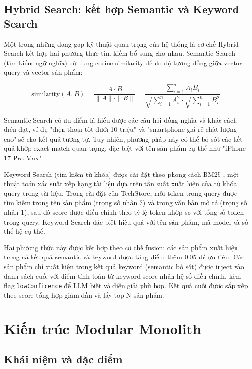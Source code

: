 \subsection{Hybrid Search: kết hợp Semantic và Keyword Search}

Một trong những đóng góp kỹ thuật quan trọng của hệ thống là cơ chế Hybrid Search kết hợp hai phương thức tìm kiếm bổ sung cho nhau. Semantic Search (tìm kiếm ngữ nghĩa) sử dụng cosine similarity để đo độ tương đồng giữa vector query và vector sản phẩm:

\begin{equation}
\text{similarity}(A, B) = \frac{A \cdot B}{\|A\| \cdot \|B\|} = \frac{\sum_{i=1}^{n} A_i B_i}{\sqrt{\sum_{i=1}^{n} A_i^2} \cdot \sqrt{\sum_{i=1}^{n} B_i^2}}
\end{equation}

Semantic Search có ưu điểm là hiểu được các câu hỏi đồng nghĩa và khác cách diễn đạt, ví dụ "điện thoại tốt dưới 10 triệu" và "smartphone giá rẻ chất lượng cao" sẽ cho kết quả tương tự. Tuy nhiên, phương pháp này có thể bỏ sót các kết quả khớp exact match quan trọng, đặc biệt với tên sản phẩm cụ thể như "iPhone 17 Pro Max".

Keyword Search (tìm kiếm từ khóa) được cài đặt theo phong cách BM25 \cite{robertson2009probabilistic}, một thuật toán xác suất xếp hạng tài liệu dựa trên tần suất xuất hiện của từ khóa query trong tài liệu. Trong cài đặt của TechStore, mỗi token trong query được tìm kiếm trong tên sản phẩm (trọng số nhân 3) và trong văn bản mô tả (trọng số nhân 1), sau đó score được điều chỉnh theo tỷ lệ token khớp so với tổng số token trong query. Keyword Search đặc biệt hiệu quả với tên sản phẩm, mã model và số thế hệ cụ thể.

Hai phương thức này được kết hợp theo cơ chế fusion: các sản phẩm xuất hiện trong cả kết quả semantic và keyword được tăng điểm thêm 0.05 để ưu tiên. Các sản phẩm chỉ xuất hiện trong kết quả keyword (semantic bỏ sót) được inject vào danh sách cuối với điểm tính toán từ keyword score nhân hệ số điều chỉnh, kèm flag \texttt{lowConfidence} để LLM biết và diễn giải phù hợp. Kết quả cuối được sắp xếp theo score tổng hợp giảm dần và lấy top-N sản phẩm.

\section{Kiến trúc Modular Monolith}

\subsection{Khái niệm và đặc điểm}


